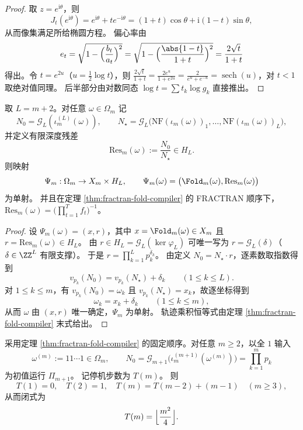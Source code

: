 \begin{proof}
取 \(z=e^{\mathrm{i}\theta}\)，则
\[
J_t(e^{\mathrm{i}\theta})
=e^{\mathrm{i}\theta}+t e^{-\mathrm{i}\theta}
=(1+t)\cos\theta+\mathrm{i}(1-t)\sin\theta,
\]
从而像集满足所给椭圆方程。
偏心率由
\[
e_t=\sqrt{1-\Bigl(\frac{b_t}{a_t}\Bigr)^2}
=\sqrt{1-\Bigl(\frac{\abs{1-t}}{1+t}\Bigr)^2}
=\frac{2\sqrt t}{1+t}
\]
得出。令 \(t=e^{2u}\)（\(u=\tfrac12\log t\)），则
\(
\frac{2\sqrt t}{1+t}
=\frac{2e^u}{1+e^{2u}}
=\frac{2}{e^u+e^{-u}}
=\operatorname{sech}(u)
\)，对 \(t<1\) 取绝对值同理。
后半部分由对数同态 \(\log t=\sum t_k\log g_k\) 直接推出。
\end{proof}

\begin{corollary}[折叠丢失信息的有限深度完备化]\label{cor:fold-residual-completion-finite-depth}
取 \(L=m+2\)。对任意 \(\omega\in\Omega_m\) 记
\[
N_0=\mathcal G_L(\iota_m^{(L)}(\omega)),\qquad
N_\star=\mathcal G_L\!\bigl(\mathrm{NF}(\iota_m(\omega))_1,\dots,\mathrm{NF}(\iota_m(\omega))_L\bigr),
\]
并定义有限深度残差
\[
\mathrm{Res}_m(\omega):=\frac{N_0}{N_\star}\in H_L.
\]
则映射
\[
\Psi_m:\Omega_m\to X_m\times H_L,\qquad
\Psi_m(\omega)=\bigl(\Fold_m(\omega),\mathrm{Res}_m(\omega)\bigr)
\]
为单射。
并且在定理 \ref{thm:fractran-fold-compiler} 的 FRACTRAN 顺序下，
\(
\mathrm{Res}_m(\omega)=\bigl(\prod_{t=1}^{T} f_t\bigr)^{-1}
\)。
\end{corollary}

\begin{proof}
设 \(\Psi_m(\omega)=(x,r)\)，其中 \(x=\Fold_m(\omega)\in X_m\) 且 \(r=\mathrm{Res}_m(\omega)\in H_L\)。
由 \(r\in H_L=\mathcal G_L(\ker\varphi_L)\) 可唯一写为 \(r=\mathcal G_L(\delta)\)（\(\delta\in\ZZ^L\) 有限支撑）。
于是 \(r=\prod_{k=1}^{L}p_k^{\delta_k}\)。
由定义 \(N_0=N_\star\cdot r\)，逐素数取指数得到
\[
v_{p_k}(N_0)=v_{p_k}(N_\star)+\delta_k\qquad (1\le k\le L).
\]
对 \(1\le k\le m\)，有 \(v_{p_k}(N_0)=\omega_k\) 且 \(v_{p_k}(N_\star)=x_k\)，故逐坐标得到
\[
\omega_k=x_k+\delta_k\qquad (1\le k\le m),
\]
从而 \(\omega\) 由 \((x,r)\) 唯一确定，\(\Psi_m\) 为单射。
轨迹乘积恒等式由定理 \ref{thm:fractran-fold-compiler} 末式给出。
\end{proof}

\begin{theorem}[全 \(1\) 输入的归约长度闭式]\label{thm:all-ones-reduction-length}
采用定理 \ref{thm:fractran-fold-compiler} 的固定顺序。对任意 \(m\ge 2\)，以全 \(1\) 输入
\[
\omega^{(m)}:=11\cdots 1\in\Omega_m,\qquad
N_0=\mathcal G_{m+1}\bigl(\iota_m^{(m+1)}(\omega^{(m)})\bigr)=\prod_{k=1}^{m} p_k
\]
为初值运行 \(\Pi_{m+1}\)。
记停机步数为 \(T(m)\)。
则
\[
T(1)=0,\quad T(2)=1,\quad T(m)=T(m-2)+(m-1)\quad (m\ge 3),
\]
从而闭式为
\[
T(m)=\Bigl\lfloor\frac{m^2}{4}\Bigr\rfloor.
\]
\end{theorem}

